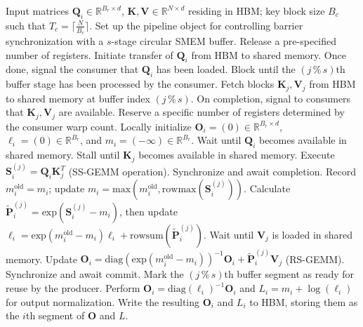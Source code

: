 \begin{algorithm}[H]
    \caption{\small\label{alg:flash3_wgmma_ws_only}\textsc{FlashAttention-3} forward pass \textbf{without} intra-consumer overlapping -- CTA perspective}
    \begin{algorithmic}[1]
\REQUIRE Input matrices $\mathbf{Q}_i \in \mathbb{R}^{B_r \times d}$, $\mathbf{K}, \mathbf{V} \in \mathbb{R}^{N \times d}$ residing in HBM; key block size $B_c$ such that $T_c = \lceil \frac{N}{B_c} \rceil$.
\STATE Set up the pipeline object for controlling barrier synchronization with a $s$-stage circular SMEM buffer.
\STATE Release a pre-specified number of registers.
\STATE Initiate transfer of $\mathbf{Q}_i$ from HBM to shared memory.
\STATE Once done, signal the consumer that $\mathbf{Q}_i$ has been loaded.
    \STATE Block until the $(j\,\%\,s)$th buffer stage has been processed by the consumer.
    \STATE Fetch blocks $\mathbf{K}_j, \mathbf{V}_j$ from HBM to shared memory at buffer index $(j\,\%\,s)$.
    \STATE On completion, signal to consumers that $\mathbf{K}_j, \mathbf{V}_j$ are available.
\ENDFOR
\ELSE 
\STATE Reserve a specific number of registers determined by the consumer warp count.
\STATE Locally initialize $\mathbf{O}_i = (0) \in \mathbb{R}^{B_r \times d}$, $\ell_i = (0) \in \mathbb{R}^{B_r}$, and $m_i = (-\infty) \in \mathbb{R}^{B_r}$.
\STATE Wait until $\mathbf{Q}_i$ becomes available in shared memory.
\STATE Stall until $\mathbf{K}_j$ becomes available in shared memory.
\STATE Execute $\mathbf{S}_i^{(j)} = \mathbf{Q}_i \mathbf{K}_j^T$ (SS-GEMM operation). Synchronize and await completion. \label{alg:ws_only_gemm1}
\STATE Record $m_i^{\mathrm{old}} = m_i$; update $m_i = \mathrm{max}(m_i^{\mathrm{old}}, \mathrm{rowmax}(\mathbf{S}_i^{(j)}))$. \label{code-ws:softmax_start}
\STATE Calculate $\widetilde{\mathbf{P}}_i^{(j)} = \mathrm{exp}(\mathbf{S}_i^{(j)} - m_i)$, then update $\ell_i = \mathrm{exp}(m_i^{\mathrm{old}} - m_i) \ell_i + \mathrm{rowsum}(\widetilde{\mathbf{P}}_i^{(j)})$. \label{code-ws:softmax_end}
\STATE Wait until $\mathbf{V}_j$ is loaded in shared memory.
\STATE Update $\mathbf{O}_i = \mathrm{diag}(\mathrm{exp}(m_i^{\mathrm{old}} - m_i))^{-1} \mathbf{O}_i + \widetilde{\mathbf{P}}_i^{(j)} \mathbf{V}_j$ (RS-GEMM). Synchronize and await commit. \label{alg:ws_only_gemm2}
\STATE Mark the $(j\,\%\,s)$th buffer segment as ready for reuse by the producer.
\ENDFOR
\STATE Perform $\mathbf{O}_i = \mathrm{diag}(\ell_i)^{-1} \mathbf{O}_i$ and $L_i = m_i + \log(\ell_i)$ for output normalization.
\STATE Write the resulting $\mathbf{O}_i$ and $L_i$ to HBM, storing them as the $i$th segment of $\mathbf{O}$ and $L$.
\ENDIF
\end{algorithmic}
\end{algorithm}

